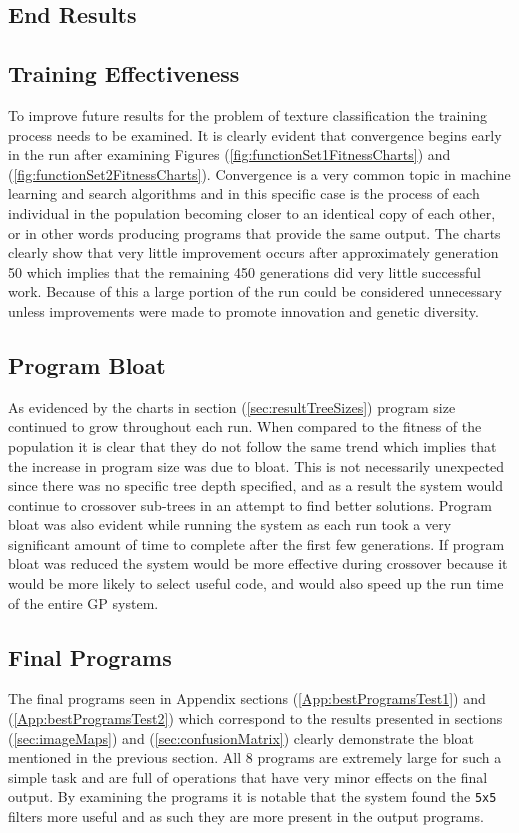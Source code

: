\documentclass[titlepage,letterpaper]{article}
\begin{document}
\subsection{End Results}
\label{sec:endresult}


\subsection{Training Effectiveness}
\label{sec:trainingeffectiveness}
To improve future results for the problem of texture classification the training process needs to be examined. It is clearly evident that convergence begins early in the run after examining Figures (\ref{fig:functionSet1FitnessCharts}) and (\ref{fig:functionSet2FitnessCharts}). Convergence is a very common topic in machine learning and search algorithms and in this specific case is the process of each individual in the population becoming closer to an identical copy of each other\cite{langdon:fogp}, or in other words producing programs that provide the same output. The charts clearly show that very little improvement occurs after approximately generation 50 which implies that the remaining 450 generations did very little successful work. Because of this a large portion of the run could be considered unnecessary unless improvements were made to promote innovation and genetic diversity.

\subsection{Program Bloat}
\label{sec:bloat}
As evidenced by the charts in section (\ref{sec:resultTreeSizes}) program size continued to grow throughout each run. When compared to the fitness of the population it is clear that they do not follow the same trend which implies that the increase in program size was due to bloat. This is not necessarily unexpected since there was no specific tree depth specified, and as a result the system would continue to crossover sub-trees in an attempt to find better solutions. Program bloat was also evident while running the system as each run took a very significant amount of time to complete after the first few generations. If program bloat was reduced the system would be more effective during crossover because it would be more likely to select useful code, and would also speed up the run time of the entire GP system.


\subsection{Final Programs}
\label{sec:programDiscussion}
The final programs seen in Appendix sections (\ref{App:bestProgramsTest1}) and (\ref{App:bestProgramsTest2}) which correspond to the results presented in sections (\ref{sec:imageMaps}) and (\ref{sec:confusionMatrix}) clearly demonstrate the bloat mentioned in the previous section. All 8 programs are extremely large for such a simple task and are full of operations that have very minor effects on the final output. By examining the programs it is notable that the system found the \texttt{5x5} filters more useful and as such they are more present in the output programs.
\end{document}
